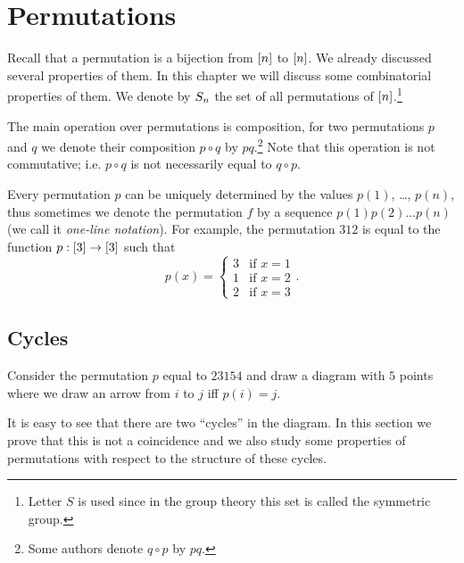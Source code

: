 \chapter{Permutations}
\label{chapter:permutations}
Recall that a permutation is a bijection from ${[{n}]}$ to ${[{n}]}$. We
already discussed several properties of them. In this chapter we will discuss
some combinatorial properties of them. We denote by $S_{n}$ the set
of all permutations of ${[{n}]}$.\footnote{%
  Letter $S$ is used since in the group theory this set is called
  the symmetric group.
}


The main operation over permutations is composition, for two permutations $p$
and $q$ we denote their composition $p \circ q$ by $pq$.\footnote{%
  Some authors denote $q \circ p$ by $pq$.
}
Note that this operation is not commutative; i.e. $p \circ q$ is not
necessarily equal to $q \circ p$.

Every permutation $p$ can be uniquely determined by the values $p(1)$, \dots,
$p(n)$, thus sometimes we denote the permutation $f$ by a sequence
$p(1) p(2) \dots p(n)$ (we call it \emph{one-line notation}).
For example, the permutation $3 1 2$ is equal to the function $p : {[{3}]} \to
{[{3}]}$
such that
\[
  p(x) =
  \begin{cases}
    3 & \text{if } x = 1 \\
    1 & \text{if } x = 2 \\
    2 & \text{if } x = 3
  \end{cases}.
\]


\section{Cycles}
Consider the permutation $p$ equal to $2 3 1 5 4$ and draw a diagram with
$5$ points where we draw an arrow from $i$ to $j$ iff $p(i) = j$.
\begin{center}
\end{center}
It is easy to see that there are two ``cycles'' in the diagram. In this section
we prove that this is not a coincidence and we also study some properties of
permutations with respect to the structure of these cycles.

